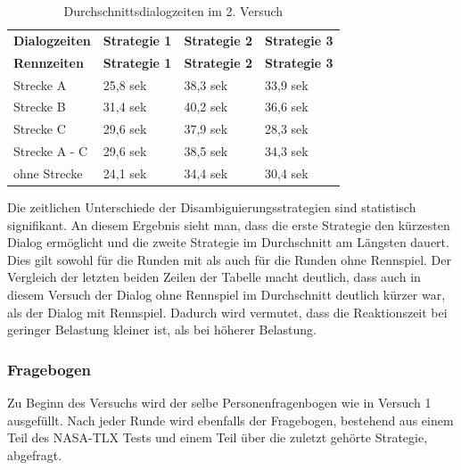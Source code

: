 \documentclass[12pt,a4paper]{scrartcl}
\begin{document}
\begin{longtable}{p{3cm}p{3cm}p{3cm}p{3cm} }
	\label{Durchschnittsdialogzeiten2}\\
		\caption[Durchschnittsdialogzeiten im 2. Versuch]{Durchschnittsdialogzeiten im 2. Versuch}\\
	\hline
	\textbf{Dialogzeiten}&\textbf{Strategie 1}&\textbf{Strategie 2} &\textbf{Strategie 3}\\
	\hline
	\endfirsthead
	\hline
	\textbf{Rennzeiten}&\textbf{Strategie 1}&\textbf{Strategie 2} &\textbf{Strategie 3}\\
	\hline
	\endhead
Strecke A & 25,8 sek & 38,3 sek & 33,9 sek \\
Strecke B & 31,4 sek & 40,2 sek & 36,6 sek \\
Strecke C  & 29,6 sek & 37,9 sek & 28,3 sek \\
Strecke A - C & 29,6 sek & 38,5 sek & 34,3 sek\\
ohne Strecke & 24,1 sek & 34,4 sek & 30,4 sek \\
\hline
\end{longtable}

Die zeitlichen Unterschiede der Disambiguierungsstrategien sind statistisch signifikant. An diesem Ergebnis sieht man, dass die erste Strategie den kürzesten Dialog ermöglicht und die zweite Strategie im Durchschnitt am Längsten dauert. Dies gilt sowohl für die Runden mit als auch für die Runden ohne Rennspiel. Der Vergleich der letzten beiden Zeilen der Tabelle macht deutlich, dass auch in diesem Versuch der Dialog ohne Rennspiel im Durchschnitt deutlich kürzer war, als der Dialog mit Rennspiel. Dadurch wird vermutet, dass die Reaktionszeit bei geringer Belastung kleiner ist, als bei höherer Belastung.  

\subsubsection{Fragebogen}
\label{fragebogen2}
Zu Beginn des Versuchs wird der selbe Personenfragenbogen wie in Versuch 1 ausgefüllt. Nach jeder Runde wird ebenfalls der Fragebogen, bestehend aus einem Teil des NASA-TLX Tests und einem Teil über die zuletzt gehörte Strategie, abgefragt.
\end{document}

